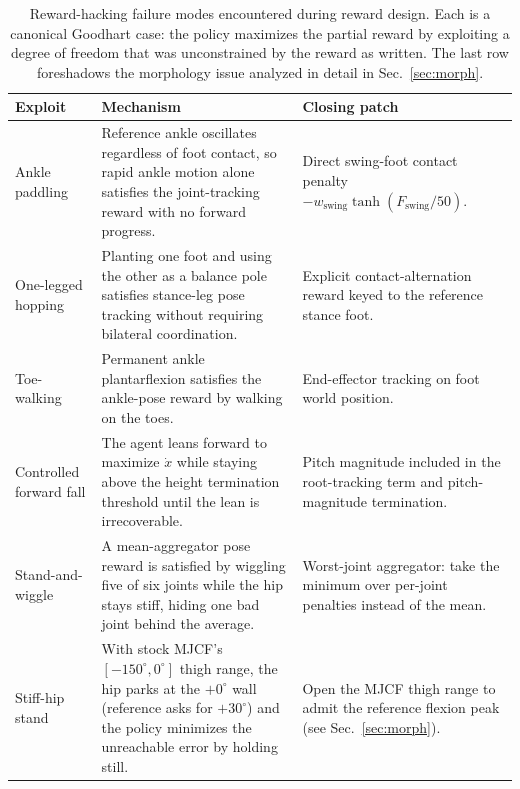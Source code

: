\documentclass{article}
\begin{document}
\begin{table}[t]
  \caption{Reward-hacking failure modes encountered during reward
  design. Each is a canonical Goodhart case: the policy maximizes
  the partial reward by exploiting a degree of freedom that was
  unconstrained by the reward as written. The last row foreshadows
  the morphology issue analyzed in detail in Sec.~\ref{sec:morph}.}
  \label{tab:exploits}
  \centering
  \small
  \begin{tabular}{p{} p{} p{}}
    \toprule
    \textbf{Exploit} & \textbf{Mechanism} & \textbf{Closing patch} \\
    \midrule
    Ankle paddling & Reference ankle oscillates regardless of foot
    contact, so rapid ankle motion alone satisfies the joint-tracking
    reward with no forward progress. & Direct swing-foot contact
    penalty $-w_{\text{swing}}\tanh(F_{\text{swing}}/50)$. \\
    \addlinespace[2pt]
    One-legged hopping & Planting one foot and using the other as a
    balance pole satisfies stance-leg pose tracking without
    requiring bilateral coordination. & Explicit contact-alternation
    reward keyed to the reference stance foot. \\
    \addlinespace[2pt]
    Toe-walking & Permanent ankle plantarflexion satisfies the
    ankle-pose reward by walking on the toes. & End-effector
    tracking on foot world position. \\
    \addlinespace[2pt]
    Controlled forward fall & The agent leans forward to maximize
    $\dot x$ while staying above the height termination threshold
    until the lean is irrecoverable. & Pitch magnitude included in
    the root-tracking term and pitch-magnitude termination. \\
    \addlinespace[2pt]
    Stand-and-wiggle & A mean-aggregator pose reward is satisfied
    by wiggling five of six joints while the hip stays stiff,
    hiding one bad joint behind the average. & Worst-joint
    aggregator: take the minimum over per-joint penalties instead
    of the mean. \\
    \addlinespace[2pt]
    Stiff-hip stand & With stock MJCF's $[-150^\circ, 0^\circ]$
    thigh range, the hip parks at the $+0^\circ$ wall (reference
    asks for $+30^\circ$) and the policy minimizes the unreachable
    error by holding still. & Open the MJCF thigh range to admit
    the reference flexion peak (see Sec.~\ref{sec:morph}). \\
    \bottomrule
  \end{tabular}
\end{table}
\end{document}
